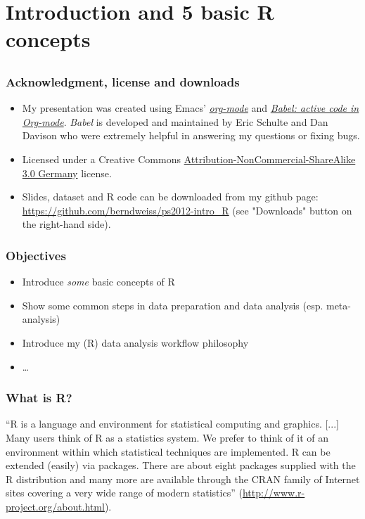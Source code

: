 \documentclass[bigger]{beamer}
\begin{document}
\section{Introduction and 5 basic R concepts}
\label{sec-1}
\subsection{}


\begin{frame}\frametitle{Acknowledgment, license and downloads}
\begin{itemize}
\item My presentation was created using Emacs' \href{http://orgmode.org/}{\emph{org-mode}} and
\href{http://orgmode.org/worg/org-contrib/babel/}{\emph{Babel: active code in 
Org-mode}}. \emph{Babel} is developed and maintained by Eric Schulte and Dan Davison who were extremely
helpful in answering my questions or fixing bugs.  
\item Licensed under a Creative Commons
\href{http://creativecommons.org/licenses/by-nc-sa/3.0/de/deed.en}{Attribution-NonCommercial-ShareAlike
3.0 Germany} license. 
\item Slides, dataset and R code can be downloaded from my github page:
\href{https://github.com/berndweiss/ps2012-intro_R}{https://github.com/berndweiss/ps2012-intro\_R} (see
"Downloads" button on the right-hand side). 
\end{itemize}
\end{frame}
\begin{frame}
\frametitle{Objectives}
\label{sec-1-1-1}

\begin{itemize}
\item Introduce \emph{some} basic concepts of R
\item Show some common steps in data preparation and data analysis (esp. meta-analysis)
\item Introduce my (R) data analysis workflow philosophy
\item \ldots{}
\end{itemize}
\end{frame}
\begin{frame}
\frametitle{What is R?}
\label{sec-1-1-2}

\enquote{R is a language and environment for statistical computing and graphics. [...] Many users think of R
as a statistics system. We prefer to think of it of an environment within which statistical
techniques are implemented. R can be extended (easily) via packages. There are about eight packages
supplied with the R distribution and many more are available through the CRAN family of Internet
sites covering a very wide range of modern statistics} (\href{http://www.r-project.org/about.html}{http://www.r-project.org/about.html}).
\end{frame}
\end{document}
